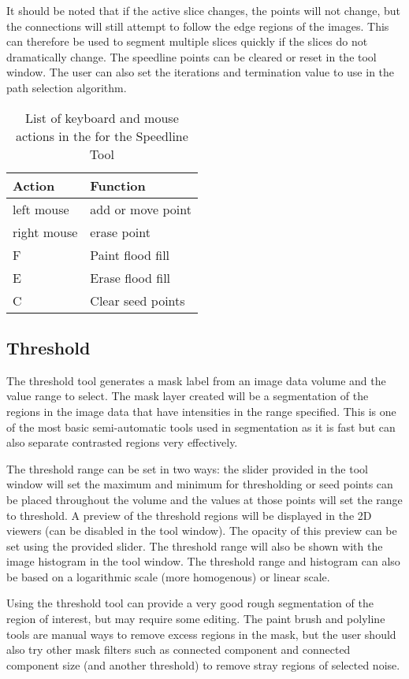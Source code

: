 \documentclass[fleqn,11pt,openany]{book}
\begin{document}
It should be noted that if the active slice changes, the points will not change, but the connections will still attempt to follow the edge regions of the images. This can therefore be used to segment multiple slices quickly if the slices do not dramatically change. The speedline points can be cleared or reset in the tool window. The user can also set the iterations and termination value to use in the path selection algorithm.

\begin{table}[h!]
\label{tab:speedlinekey}
\caption{List of keyboard and mouse actions in the for the Speedline Tool}
\begin{tabular}{|l|l|}
\hline
{\bf Action} & {\bf Function}\\
\hline 
left mouse & add or move point\\
\hline
right mouse & erase point\\
\hline
F & Paint flood fill\\
\hline
E & Erase flood fill\\
\hline
C & Clear seed points\\
\hline
\end{tabular}
\end{table}

\subsection{Threshold}

The threshold tool generates a mask label from an image data volume and the value range to select.  The mask layer created will be a segmentation of the regions in the image data that have intensities in the range specified.  This is one of the most basic semi-automatic tools used in segmentation as it is fast but can also separate contrasted regions very effectively.  

The threshold range can be set in two ways: the slider provided in the tool window will set the maximum and minimum for thresholding or seed points can be placed throughout the volume and the values at those points will set the range to threshold. A preview of the threshold regions will be displayed in the 2D viewers (can be disabled in the tool window).   The opacity of this preview can be set using the provided slider.   The threshold range will also be shown with the image histogram in the tool window. The threshold range and histogram can also be based on a logarithmic scale (more homogenous) or linear scale.  

Using the threshold tool can provide a very good rough segmentation of the region of interest, but may require some editing.  The paint brush and polyline tools are manual ways to remove excess regions in the mask, but the user should also try other mask filters such as connected component and connected component size (and another threshold) to remove stray regions of selected noise.  
\end{document}
